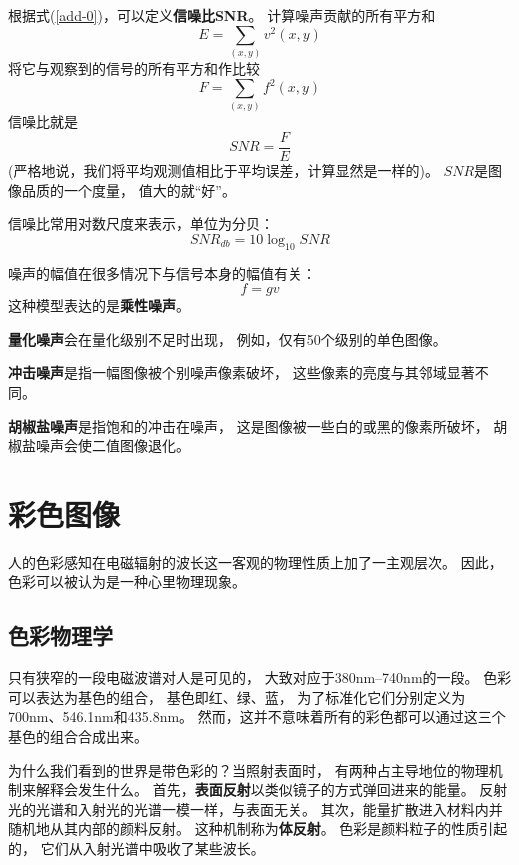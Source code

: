 根据式(\ref{add-0})，可以定义\textbf{\color{magenta}信噪比SNR}。%
计算噪声贡献的所有平方和
\begin{equation}
  E = \sum_{(x,y)}v^{2}(x,y)
\end{equation}
将它与观察到的信号的所有平方和作比较
\begin{equation}
  F = \sum_{(x,y)}f^{2}(x,y)
\end{equation}
信噪比就是
\begin{equation}
  SNR = \frac{F}{E}  
\end{equation}
(严格地说，我们将平均观测值相比于平均误差，计算显然是一样的)。%
$SNR$是图像品质的一个度量，%
值大的就“好”。

信噪比常用对数尺度来表示，单位为分贝：
\begin{equation}
  SNR_{db} = 10\log_{10}SNR
\end{equation}

噪声的幅值在很多情况下与信号本身的幅值有关：
\begin{equation}
  f = gv  
\end{equation}
这种模型表达的是\textbf{\color{magenta}乘性噪声}。

\textbf{\color{magenta}量化噪声}会在量化级别不足时出现，%
例如，仅有50个级别的单色图像。%

\textbf{\color{magenta}冲击噪声}是指一幅图像被个别噪声像素破坏，%
这些像素的亮度与其邻域显著不同。%

\textbf{\color{magenta}胡椒盐噪声}是指饱和的冲击在噪声，%
这是图像被一些白的或黑的像素所破坏，%
胡椒盐噪声会使二值图像退化。




\section{彩色图像}
人的色彩感知在电磁辐射的波长这一客观的物理性质上加了一主观层次。%
因此，色彩可以被认为是一种心里物理现象。

\subsection{色彩物理学}
只有狭窄的一段电磁波谱对人是可见的，%
大致对应于380nm--740nm的一段。%
色彩可以表达为基色的组合，%
基色即红、绿、蓝，%
为了标准化它们分别定义为700nm、546.1nm和435.8nm。%
然而，这并不意味着所有的彩色都可以通过这三个基色的组合合成出来。

为什么我们看到的世界是带色彩的？当照射表面时，%
有两种占主导地位的物理机制来解释会发生什么。%
首先，\textbf{\color{magenta}表面反射}以类似镜子的方式弹回进来的能量。%
反射光的光谱和入射光的光谱一模一样，与表面无关。%
其次，能量扩散进入材料内并随机地从其内部的颜料反射。%
这种机制称为\textbf{\color{magenta}体反射}。%
色彩是颜料粒子的性质引起的，%
它们从入射光谱中吸收了某些波长。

